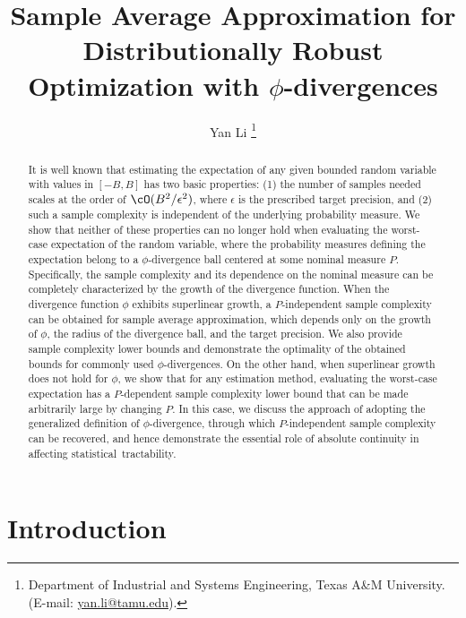 \documentclass[9pt]{article} %
\title{
 Sample Average Approximation for Distributionally Robust Optimization with $\phi$-divergences
    }
\author{  
    Yan Li   \thanks{Department of Industrial and Systems Engineering,
Texas A\&M University. (E-mail: \url{yan.li@tamu.edu}).}
}
\date{\vspace{-6ex}}
\numberwithin{equation}{section}
\begin{document}
{
\makeatletter
\addtocounter{footnote}{1} %
\renewcommand\thefootnote{\@fnsymbol\c@footnote}%
\makeatother
\maketitle
}




\begin{abstract}
It is well known that estimating the expectation of any given bounded random variable with values in $[-B, B]$ has two basic properties: 
(1) the number of samples needed scales at the order of  $\cO(B^2/\epsilon^2)$, where $\epsilon$ is the prescribed target precision, and (2) such a sample complexity is independent of the underlying probability measure. We show that neither  of these properties can no longer hold when evaluating the worst-case expectation of the random variable, where the probability measures defining the expectation belong to a $\phi$-divergence ball centered at some nominal measure $P$. Specifically, the sample complexity and its dependence on the nominal measure can be completely characterized by the growth of the divergence function. When the divergence function $\phi$ exhibits superlinear growth,  a $P$-independent sample complexity can be obtained for sample average approximation, which depends only on the growth of $\phi$, the radius of the divergence ball, and the target precision. 
We also provide sample complexity lower bounds and demonstrate the optimality of the obtained bounds for commonly used $\phi$-divergences. 
On the other hand, when superlinear growth does not hold for $\phi$, we show that for any estimation method, evaluating the worst-case expectation has a $P$-dependent sample complexity lower bound that can be made arbitrarily large by changing $P$.
In this case, we discuss the approach of adopting the generalized definition of $\phi$-divergence, through which $P$-independent sample complexity can be recovered, and hence demonstrate the essential role of absolute continuity in affecting statistical~tractability.  
\end{abstract}



\section{Introduction}
\end{document}
